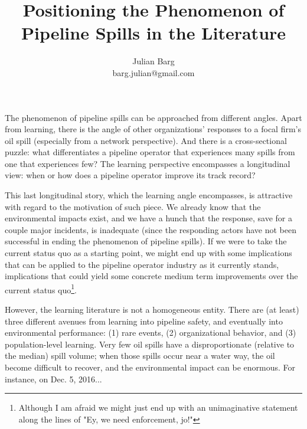 \documentclass[12pt, man, natbib]{apa6}
\title{Positioning the Phenomenon of Pipeline Spills in the Literature}
\author{Julian Barg\\barg.julian@gmail.com}
\affiliation{Ivey Business School}
\begin{document}
	
	\maketitle
	
	\singlespacing
	
	\section{}	
	
	The phenomenon of pipeline spills can be approached from different angles. Apart from learning, there is the angle of other organizations' responses to a focal firm's oil spill (especially from a network perspective). And there is a cross-sectional puzzle: what differentiates a pipeline operator that experiences many spills from one that experiences few? The learning perspective encompasses a longitudinal view: when or how does a pipeline operator improve its track record? 
	
	This last longitudinal story, which the learning angle encompasses, is attractive with regard to the motivation of such piece. We already know that the environmental impacts exist, and we have a hunch that the response, save for a couple major incidents, is inadequate (since the responding actors have not been successful in ending the phenomenon of pipeline spills). If we were to take the current status quo as a starting point, we might end up with some implications that can be applied to the pipeline operator industry as it currently stands, implications that could yield some concrete medium term improvements over the current status quo\footnote{Although I am afraid we might just end up with an unimaginative statement along the lines of "Ey, we need enforcement, jo!"}.
	
	However, the learning literature is not a homogeneous entity. There are (at least) three different avenues from learning into pipeline safety, and eventually into environmental performance: (1) rare events, (2) organizational behavior, and (3) population-level learning. Very few oil spills have a disproportionate (relative to the median) spill volume; when those spills occur near a water way, the oil become difficult to recover, and the environmental impact can be enormous. For instance, on Dec. 5, 2016...


\end{document}
